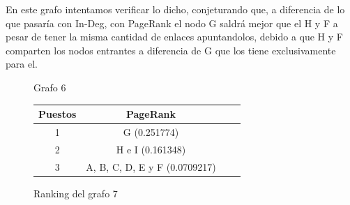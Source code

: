 En este grafo intentamos verificar lo dicho, conjeturando que, a diferencia de lo que pasaría con In-Deg, con PageRank el nodo G saldrá mejor que el H y F a pesar de tener la misma cantidad de enlaces apuntandolos, debido a que H y F comparten los nodos entrantes a diferencia de G que los tiene exclusivamente para el.
\begin{figure}[H]
\centering
{}
  \caption{\footnotesize{ Grafo 6 }}
  \label{fig:Rankings}
\end{figure}

\begin{figure}[H]
\centering
\begin{tabular}{| c | c | c | c |}
  \hline
  Puestos & PageRank\\ \hline \hline
  1 & G (0.251774)\\ \hline
  2 & H e I (0.161348)\\ \hline
  3 & A, B, C, D, E y F (0.0709217)\\ \hline
\end{tabular}
  \caption{\footnotesize{Ranking del grafo 7}}
  \label{fig:Rankings}
\end{figure}

